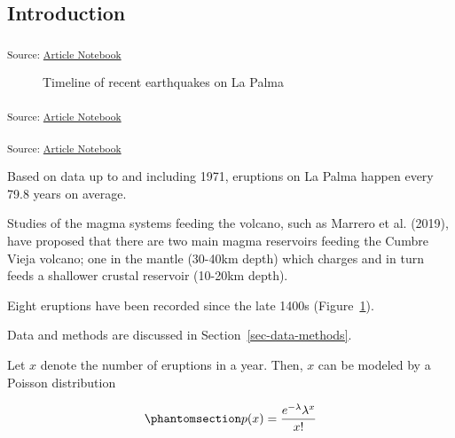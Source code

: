 \documentclass[
]{agujournal2019}
\begin{document}
\subsection{Introduction}\label{introduction}

\textsubscript{Source:
\href{https://EmouAcademy.github.io/my-awesome-manuscripts/index.qmd.html}{Article
Notebook}}

\label{cell-fig-timeline}
\begin{figure}[H]


\caption{\label{fig-timeline}Timeline of recent earthquakes on La Palma}

\end{figure}%

\textsubscript{Source:
\href{https://EmouAcademy.github.io/my-awesome-manuscripts/index.qmd.html}{Article
Notebook}}

\textsubscript{Source:
\href{https://EmouAcademy.github.io/my-awesome-manuscripts/index.qmd.html}{Article
Notebook}}

Based on data up to and including 1971, eruptions on La Palma happen
every 79.8 years on average.

Studies of the magma systems feeding the volcano, such as Marrero et al.
(2019), have proposed that there are two main magma reservoirs feeding
the Cumbre Vieja volcano; one in the mantle (30-40km depth) which
charges and in turn feeds a shallower crustal reservoir (10-20km depth).

Eight eruptions have been recorded since the late 1400s
(Figure~\ref{fig-timeline}).

Data and methods are discussed in Section~\ref{sec-data-methods}.

Let \(x\) denote the number of eruptions in a year. Then, \(x\) can be
modeled by a Poisson distribution

\begin{equation}\phantomsection\label{eq-poisson}{
p(x) = \frac{e^{-\lambda} \lambda^{x}}{x !}
}\end{equation}
\end{document}
